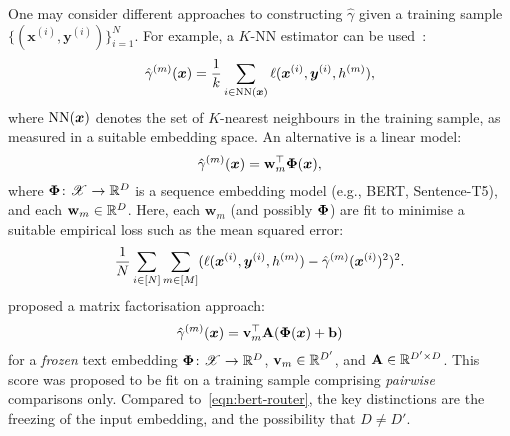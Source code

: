 One may consider different approaches to constructing $\hat{\gamma}$
given a training sample 
$\{ ( \boldsymbol{x}^{(i)}, \boldsymbol{y}^{(i)} ) \}_{i = 1}^{N}$.
For example, a $K$-NN estimator can be used~\citep[Section 5.1]{HuBieLi2024}:
\begin{equation}
    \label{eqn:knn-router}
    \hat{\gamma}^{(m)}( \boldsymbol{x} ) = \frac{1}{k} \sum_{i \in {\rm NN}( \boldsymbol{x} )} \ell( \boldsymbol{x}^{(i)}, \boldsymbol{y}^{(i)}, h^{(m)} ),    
\end{equation}
where ${\rm NN}( \boldsymbol{x} )$ denotes the set of $K$-nearest neighbours in the training sample, as measured in a suitable embedding space.
An alternative is a linear model:
\begin{equation}
    \label{eqn:bert-router}
    \hat{\gamma}^{(m)}( \boldsymbol{x} ) = \mathbf{w}_{m}^\top \boldsymbol{\Phi}( \boldsymbol{x} ),
\end{equation}
where
$\boldsymbol{\Phi} \colon \mathscr{X} \to \mathbb{R}^{D}$ is a sequence embedding model (e.g., BERT, Sentence-T5),
and each $\mathbf{w}_m \in \mathbb{R}^D$.
Here, each $\mathbf{w}_m$ (and possibly $\boldsymbol{\Phi}$)
are fit to minimise a suitable empirical loss 
such as the mean squared error:
$$ \frac{1}{N} \sum_{i \in [ N ]} \sum_{m \in [ M ]} ( \ell( \boldsymbol{x}^{(i)}, \boldsymbol{y}^{(i)}, h^{(m)} ) - \hat{\gamma}^{(m)}( \boldsymbol{x}^{(i)} )^2 )^2. $$
\citet{OngAlmWu2024} proposed a matrix factorisation approach:
$$ \hat{\gamma}^{(m)}( \boldsymbol{x} ) = \mathbf{v}_{m}^\top \mathbf{A} (\boldsymbol{\Phi}( \boldsymbol{x} ) + \mathbf{b}) $$
for a \emph{frozen} text embedding $\boldsymbol{\Phi} \colon \mathscr{X} \to \mathbb{R}^{D}$, 
$\mathbf{v}_m \in \mathbb{R}^{D'}$,
and $\mathbf{A} \in \mathbb{R}^{D' \times D}$.
This score was proposed to be fit on a training sample comprising \emph{pairwise} comparisons only.
Compared to~\eqref{eqn:bert-router},
the key distinctions are the freezing of the input embedding,
and the possibility that $D \neq D'$.





